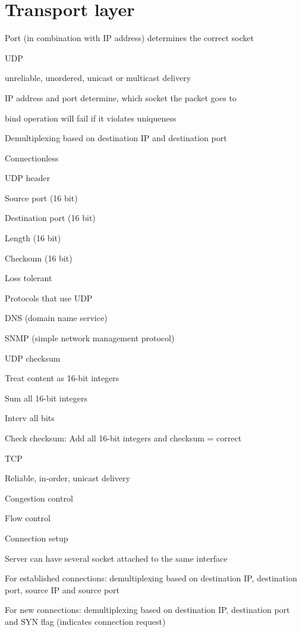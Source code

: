 \section{Transport layer}
\enumstart
	\item Port (in combination with IP address) determines the correct socket
	\item UDP
	\enumstart
		\item unreliable, unordered, unicast or multicast delivery
		\item IP address and port determine, which socket the packet goes to
		\item bind operation will fail if it violates uniqueness
		\item Demultiplexing based on destination IP and destination port
		\item Connectionless
		\item UDP header
		\enumstart
			\item Source port (16 bit)
			\item Destination port (16 bit)
			\item Length (16 bit)
			\item Checksum (16 bit)
		\enumend
		\item Loss tolerant
		\item Protocols that use UDP
		\enumstart
			\item DNS (domain name service)
			\item SNMP (simple network management protocol)
		\enumend
		\item UDP checksum
		\enumstart
			\item Treat content as 16-bit integers
			\item Sum all 16-bit integers
			\item Interv all bits
			\item Check checksum: Add all 16-bit integers and checksum  = correct
		\enumend
	\enumend
	\item TCP
	\enumstart
		\item Reliable, in-order, unicast delivery
		\item Congestion control
		\item Flow control
		\item Connection setup
		\item Server can have several socket attached to the same interface
		\item For established connections: demultiplexing based on destination IP, destination port, source IP and source port
		\item For new connections: demultiplexing based on destination IP, destination port and SYN flag (indicates connection request)
